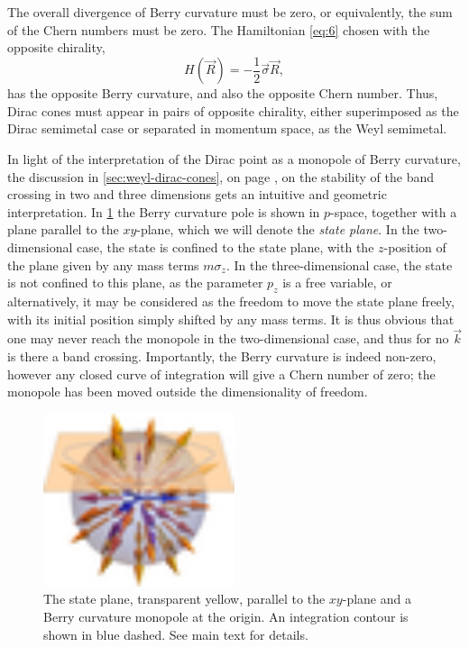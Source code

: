 The overall divergence of Berry curvature must be zero, or equivalently, the sum of the Chern numbers must be zero.
The Hamiltonian \cref{eq:6} chosen with the opposite chirality,
\begin{equation}
  H(\vec{R}) = -\frac{1}{2} \vec{\sigma} \vec{R},
\end{equation}
has the opposite Berry curvature, and also the opposite Chern number.
Thus, Dirac cones must appear in pairs of opposite chirality, either superimposed as the Dirac semimetal case or separated in momentum space, as the Weyl semimetal.

In light of the interpretation of the Dirac point as a monopole of Berry curvature, the discussion in \cref{sec:weyl-dirac-cones}, on page \pageref{sec:stability-of-gap}, on the stability of the band crossing in two and three dimensions gets an intuitive and geometric interpretation.
In \cref{fig:curvature_plane} the Berry curvature pole is shown in $p$-space, together with a plane parallel to the $xy$-plane, which we will denote the \emph{state plane}.
In the two-dimensional case, the state is confined to the state plane, with the $z$-position of the plane given by any mass terms $m \sigma _z$.
In the three-dimensional case, the state is not confined to this plane, as the parameter $p_z$ is a free variable, or alternatively, it may be considered as the freedom to move the state plane freely, with its initial position simply shifted by any mass terms.
It is thus obvious that one may never reach the monopole in the two-dimensional case, and thus for no $\vec{k}$ is there a band crossing.
Importantly, the Berry curvature is indeed non-zero, however any closed  curve of integration will give a Chern number of zero;
the  monopole has been moved outside the dimensionality of freedom.
\begin{figure}[ht]
  \centering
  \includegraphics[width=0.5\textwidth]{figures/berryCurvePlanewpath-small.png}
  \caption{The state plane, transparent yellow, parallel to the $xy$-plane and a Berry curvature monopole at the origin.
  An integration contour is shown in blue dashed.
  See main text for details.}
  \label{fig:curvature_plane}
\end{figure}


